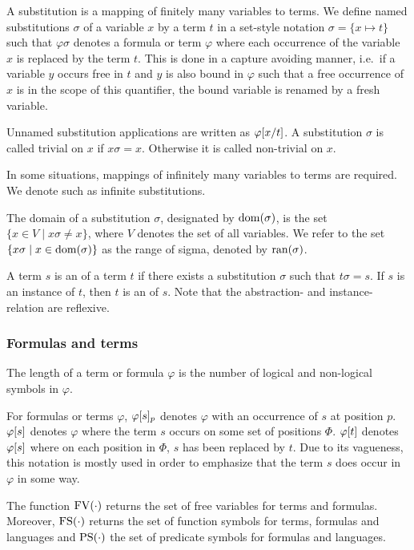 A substitution is a mapping of finitely many variables to terms.
We define named substitutions $\sigma$ of a variable $x$ by a term $t$ in a set-style notation $\sigma = \{ x \mapsto t\}$ such that 
$\varphi\sigma$ denotes a formula or term $\varphi$ where each occurrence of the variable $x$ is replaced by the term $t$.
This is done in a capture avoiding manner, i.e.\ if a variable $y$ occurs free in $t$ and $y$ is also bound in $\varphi$ such that a free occurrence of $x$ is in the scope of this quantifier, the bound variable is renamed by a fresh variable.

Unnamed substitution applications are written as $\varphi[x/t]$.
A substitution $\sigma$ is called trivial on $x$ if $x\sigma = x$. Otherwise it is called non-trivial on $x$.

In some situations, mappings of infinitely many variables to terms are required. We denote such as infinite substitutions.

The domain of a substitution $\sigma$, designated by $\operatorname{dom}(\sigma)$, is the set $\{x \in V \mid x\sigma \neq x\}$, where $V$ denotes the set of all variables.
We refer to the set $\{x\sigma \mid x\in \operatorname{dom}(\sigma)\}$ as the range of sigma, denoted by $\operatorname{ran}(\sigma)$.



A term $s$ is an  of a term $t$ if there exists a substitution $\sigma$ such that $t\sigma = s$.
If $s$ is an instance of $t$, then $t$ is an  of $s$. Note that the abstraction- and instance-relation are reflexive. 

\subsubsection*{Formulas and terms}
The length of a term or formula $\varphi$ is the number of logical and non-logical symbols in $\varphi$.

For formulas or terms $\varphi$, $\varphi{\ensuremath{[s]}_{p}}$ denotes $\varphi$ with an occurrence of $s$ at position $p$.
$\varphi[s]$ denotes $\varphi$ where the term $s$ occurs on some set of positions $\Phi$. $\varphi[t]$ denotes $\varphi[s]$ where on each position in $\Phi$, $s$ has been replaced by $t$. Due to its vagueness, this notation is mostly used in order to emphasize that the term $s$ does occur in $\varphi$ in some way.

The function $\operatorname{FV}(\cdot)$ returns the set of free variables for terms and formulas.
Moreover,
$\operatorname{FS}(\cdot)$ returns the set of function symbols for terms, formulas and languages and $\operatorname{PS}(\cdot)$ the set of predicate symbols for formulas and languages.



